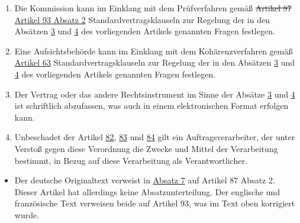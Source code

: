 \begin{enumerate}
  \item Die Kommission kann im Einklang mit dem Prüfverfahren gemäß \sout{Artikel 87} \hyperref[itm:93-2]{Artikel 93
   Absatz 2} Standardvertragsklauseln zur Regelung der in den Absätzen \hyperref[itm:28-3-1]{3} und \hyperref[itm:28-4]
   {4} des vorliegenden Artikels genannten Fragen festlegen.
  \label{itm:28-7}

  \item Eine Aufsichtsbehörde kann im Einklang mit dem Kohärenzverfahren gemäß \hyperref[ch:63]{Artikel 63}
   Standardvertragsklauseln zur Regelung der in den Absätzen \hyperref[itm:28-3-1]{3} und \hyperref[itm:28-4]{4} des
   vorliegenden Artikels genannten Fragen festlegen.
  \label{itm:28-8}

  \item Der Vertrag oder das andere Rechtsinstrument im Sinne der Absätze \hyperref[itm:28-3-1]{3} und \hyperref
  [itm:28-4]
   {4} ist schriftlich abzufassen, was auch in einem elektronischen Format erfolgen kann.
  \label{itm:28-9}

  \item Unbeschadet der Artikel \hyperref[ch:82]{82}, \hyperref[ch:83]{83} und \hyperref[ch:84]{84} gilt ein
   Auftragsverarbeiter, der unter Verstoß gegen diese Verordnung die Zwecke und Mittel der Verarbeitung bestimmt, in
   Bezug auf diese Verarbeitung als Verantwortlicher.
  \label{itm:28-10}

\end{enumerate}


\begin{itemize}

  \item Der deutsche Originaltext verweist in \hyperref[itm:28-7]{Absatz 7} auf Artikel 87 Absatz 2. Dieser Artikel hat
  allerdings keine Absatzunterteilung. Der englische und französische Text verweisen beide auf Artikel 93, was im Text
  oben korrigiert wurde.

\end{itemize}

